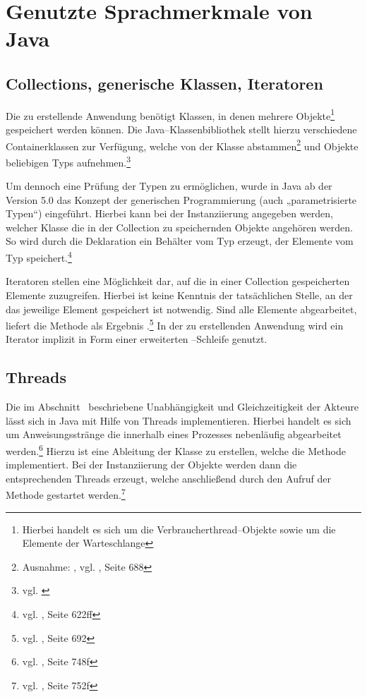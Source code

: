 

\newpage
\section{Genutzte Sprachmerkmale von Java} %
\label{sec:genutzte_sprachmerkmale_von_java}

\subsection{Collections, generische Klassen, Iteratoren} %
\label{sub:generics}
Die zu erstellende Anwendung benötigt Klassen, in denen mehrere Objekte\footnote{Hierbei handelt es sich um die Verbraucherthread–Objekte sowie um die Elemente der Warteschlange} gespeichert werden können. Die Java–Klassenbibliothek stellt hierzu verschiedene Containerklassen zur Verfügung, welche von der Klasse  abstammen\footnote{Ausnahme: , vgl. \cite{javaorange}, Seite 688} und Objekte beliebigen Typs aufnehmen.\footnote{vgl. \cite{javadoc:collection}}

Um dennoch eine Prüfung der Typen zu ermöglichen, wurde in Java ab der Version 5.0 das Konzept der generischen Programmierung (auch „parametrisierte Typen“) eingeführt. Hierbei kann bei der Instanziierung angegeben werden, welcher Klasse die in der Collection zu speichernden Objekte angehören werden. So wird durch die Deklaration  ein Behälter vom Typ  erzeugt, der Elemente vom Typ  speichert.\footnote{vgl. \cite{javaorange}, Seite 622ff}

Iteratoren stellen eine Möglichkeit dar, auf die in einer Collection gespeicherten Elemente zuzugreifen. Hierbei ist keine Kenntnis der tatsächlichen Stelle, an der das jeweilige Element gespeichert ist notwendig. Sind alle Elemente abgearbeitet, liefert die Methode  als Ergebnis .\footnote{vgl. \cite{javaorange}, Seite 692} In der zu erstellenden Anwendung wird ein Iterator implizit in Form einer erweiterten –Schleife genutzt.

\subsection{Threads} %
\label{sub:die_klasse_thread}
Die im Abschnitt~ beschriebene Unabhängigkeit und Gleichzeitigkeit der Akteure lässt sich in Java mit Hilfe von Threads implementieren. Hierbei handelt es sich um Anweisungsstränge die innerhalb eines Prozesses nebenläufig abgearbeitet werden.\footnote{vgl. \cite{javaorange}, Seite 748f}
Hierzu ist eine Ableitung der Klasse  zu erstellen, welche die Methode  implementiert. Bei der Instanziierung der Objekte werden dann die entsprechenden Threads erzeugt, welche anschließend durch den Aufruf der Methode  gestartet werden.\footnote{vgl. \cite{javaorange}, Seite 752f}

